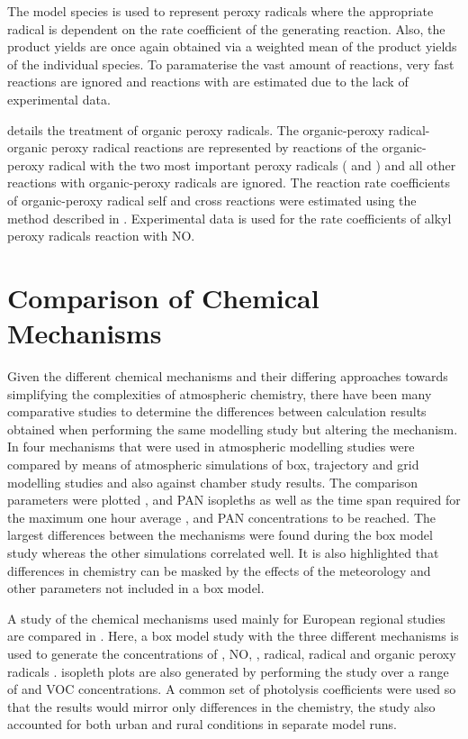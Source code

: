 The model species  is used to represent peroxy radicals where the appropriate  radical is dependent on the rate 
coefficient of the generating reaction. Also, the product yields are once again obtained via a weighted mean of the product 
yields of the individual species. To paramaterise the vast amount of reactions, very fast reactions are ignored and reactions 
with  are estimated due to the lack of experimental data. 

\citep{Kirchner:1996} details the treatment of organic peroxy radicals. The organic-peroxy radical-organic peroxy radical 
reactions are represented by reactions of the organic-peroxy radical with the two most important peroxy radicals ( and
) and all other reactions with organic-peroxy radicals are ignored. The reaction rate coefficients of 
organic-peroxy radical self and cross reactions were estimated using the method described in \citep{Kirchner:1996}. Experimental 
data is used for the rate coefficients of alkyl peroxy radicals reaction with NO. 

\section{Comparison of Chemical Mechanisms}
Given the different chemical mechanisms and their differing approaches towards simplifying the complexities of atmospheric 
chemistry, there have been many comparative studies to determine the differences between calculation results obtained when 
performing the same modelling study but altering the mechanism. In \citep{Dunker:1984} four mechanisms that were used in 
atmospheric modelling studies were compared by means of atmospheric simulations of box, trajectory and grid modelling studies 
and also against chamber study results. The comparison parameters were plotted ,  and PAN isopleths as well as 
the time span required for the maximum one hour average ,  and PAN concentrations to be reached. The largest 
differences between the mechanisms were found during the box model study whereas the other simulations correlated well. It is 
also highlighted that differences in chemistry can be masked by the effects of the meteorology and other parameters not included
in a box model.

A study of the chemical mechanisms used mainly for European regional studies are compared in \citep{Gross:2003}. Here, a box 
model study with the three different mechanisms is used to generate the concentrations of , NO, ,  
radical,  radical and organic peroxy radicals .  isopleth plots are also generated by performing the 
study over a range of  and VOC concentrations. A common set of photolysis coefficients were used so that the results 
would mirror only differences in the chemistry, the study also accounted for both urban and rural conditions in separate model 
runs.

